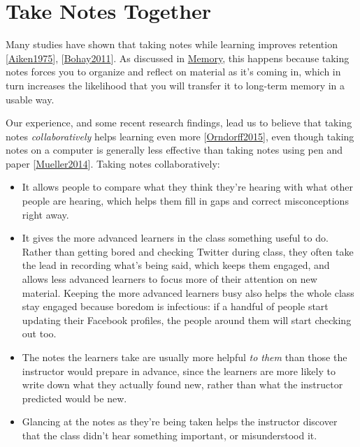 \documentclass[10pt,statementpaper]{memoir}
\begin{document}
\section{Take Notes Together}\label{take-notes-together}

Many studies have shown that taking notes while learning improves
retention {[}\href{biblio.html\#aiken-note-taking}{Aiken1975}{]},
{[}\href{biblio.html\#bohay-note-taking}{Bohay2011}{]}. As discussed in
\href{memory.html}{Memory}, this happens because taking notes forces you
to organize and reflect on material as it's coming in, which in turn
increases the likelihood that you will transfer it to long-term memory
in a usable way.

Our experience, and some recent research findings, lead us to believe
that taking notes \emph{collaboratively} helps learning even more
{[}\href{biblio.html\#orndorff-note-taking}{Orndorff2015}{]}, even
though taking notes on a computer is generally less effective than
taking notes using pen and paper
{[}\href{biblio.html\#mueller-note-taking}{Mueller2014}{]}. Taking notes
collaboratively:

\begin{itemize}
\item
  It allows people to compare what they think they're hearing with what
  other people are hearing, which helps them fill in gaps and correct
  misconceptions right away.
\item
  It gives the more advanced learners in the class something useful to
  do. Rather than getting bored and checking Twitter during class, they
  often take the lead in recording what's being said, which keeps them
  engaged, and allows less advanced learners to focus more of their
  attention on new material. Keeping the more advanced learners busy
  also helps the whole class stay engaged because boredom is infectious:
  if a handful of people start updating their Facebook profiles, the
  people around them will start checking out too.
\item
  The notes the learners take are usually more helpful \emph{to them}
  than those the instructor would prepare in advance, since the learners
  are more likely to write down what they actually found new, rather
  than what the instructor predicted would be new.
\item
  Glancing at the notes as they're being taken helps the instructor
  discover that the class didn't hear something important, or
  misunderstood it.
\end{itemize}
\end{document}
